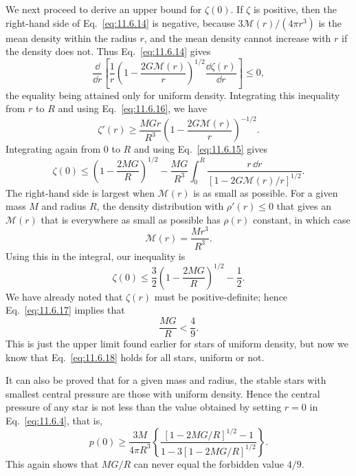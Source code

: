 We next proceed to derive an upper bound for \(\zeta(0)\). If \(\zeta\) is
positive, then the right-hand side of Eq.~\eqref{eq:11.6.14} is negative,
because \(3\mathcal{M}(r)/(4\pi r^3)\) is the mean density within the radius
\(r\), and the mean density cannot increase with \(r\) if the density does
not. Thus Eq.~\eqref{eq:11.6.14} gives
\[
  \frac{\dd}{\dd r}
  \left[
    \frac1r
    \left(1-\frac{2G\mathcal{M}(r)}r\right)^{1/2}
    \frac{\dd\zeta(r)}{\dd r}
  \right]
  \le0,
\]
the equality being attained only for uniform density. Integrating this
inequality from \(r\) to \(R\) and using Eq.~\eqref{eq:11.6.16}, we have
\[
  \zeta'(r)
  \ge
  \frac{MGr}{R^3}
  \left(1-\frac{2G\mathcal{M}(r)}r\right)^{-1/2}.
\]
Integrating again from \(0\) to \(R\) and using
Eq.~\eqref{eq:11.6.15} gives
\[
  \zeta(0)
  \le
  \left(1-\frac{2MG}{R}\right)^{1/2}
  -\frac{MG}{R^3}
  \int_0^R
  \frac{r\,\dd r}
  {[1-2G\mathcal{M}(r)/r]^{1/2}}.
\]
The right-hand side is largest when \(\mathcal{M}(r)\) is as small as
possible. For a given mass \(M\) and radius \(R\), the density distribution
with \(\rho'(r)\le0\) that gives an \(\mathcal{M}(r)\) that is everywhere as
small as possible has \(\rho(r)\) constant, in which case
\[
  \mathcal{M}(r)=\frac{Mr^3}{R^3}.
\]
Using this in the integral, our inequality is
\begin{equation}
  \zeta(0)
  \le
  \frac32\left(1-\frac{2MG}{R}\right)^{1/2}-\frac12.
  \tag{11.6.17}\label{eq:11.6.17}
\end{equation}
We have already noted that \(\zeta(r)\) must be positive-definite; hence
Eq.~\eqref{eq:11.6.17} implies that
\begin{equation}
  \frac{MG}{R}<\frac49.
  \tag{11.6.18}\label{eq:11.6.18}
\end{equation}
This is just the upper limit found earlier for stars of uniform density, but
now we know that Eq.~\eqref{eq:11.6.18} holds for all stars, uniform or not.

It can also be proved that for a given mass and radius, the stable stars with
smallest central pressure are those with uniform density. Hence the central
pressure of any star is not less than the value obtained by setting \(r=0\)
in Eq.~\eqref{eq:11.6.4}, that is,
\begin{equation}
  p(0)
  \ge
  \frac{3M}{4\pi R^3}
  \left\{
    \frac{[1-2MG/R]^{1/2}-1}
    {1-3[1-2MG/R]^{1/2}}
  \right\}.
  \tag{11.6.19}\label{eq:11.6.19}
\end{equation}
This again shows that \(MG/R\) can never equal the forbidden value \(4/9\).

